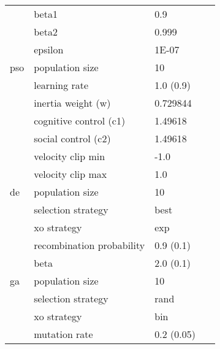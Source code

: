 \begin{table}[H]
{\begin{tabular}{llll}
			                   & beta1                     & 0.9            &                            \\
			                   & beta2                     & 0.999          &                            \\
			                   & epsilon                   & 1E-07          &                            \\
			pso                & population size           & 10             & ~\cite{ref:van:2010}       \\
			                   & learning rate             & 1.0 (0.9)      &                            \\
			                   & inertia weight (w)        & 0.729844       &                            \\
			                   & cognitive control (c1)    & 1.49618        &                            \\
			                   & social control (c2)       & 1.49618        &                            \\
			                   & velocity clip min         & -1.0           &                            \\
			                   & velocity clip max         & 1.0            &                            \\
			de                 & population size           & 10             & ~\cite{ref:mezura:2006}    \\
			                   & selection strategy        & best           &                            \\
			                   & xo strategy               & exp            &                            \\
			                   & recombination probability & 0.9 (0.1)      &                            \\
			                   & beta                      & 2.0 (0.1)      &                            \\
			ga                 & population size           & 10             & ~\cite{ref:lambora:2019}   \\
			                   & selection strategy        & rand           &                            \\
			                   & xo strategy               & bin            &                            \\
			                   & mutation rate             & 0.2 (0.05)     &                            \\
		\end{tabular}%
	}
\end{table}%
